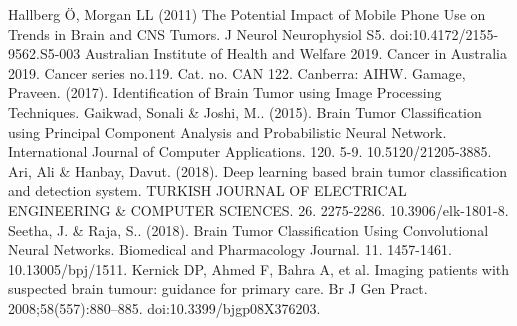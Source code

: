 \documentclass[conference]{IEEEtran}
\begin{document}
\begin{thebibliography}{00}
 Hallberg Ö, Morgan LL (2011) The Potential Impact of Mobile Phone Use on Trends in Brain and CNS Tumors. J Neurol Neurophysiol S5. doi:10.4172/2155-9562.S5-003
 Australian Institute of Health and Welfare 2019. Cancer in Australia 2019. Cancer series no.119. Cat. no. CAN 122. Canberra: AIHW.
 Gamage, Praveen. (2017). Identification of Brain Tumor using Image Processing Techniques. 
 Gaikwad, Sonali \& Joshi, M.. (2015). Brain Tumor Classification using Principal Component Analysis and Probabilistic Neural Network. International Journal of Computer Applications. 120. 5-9. 10.5120/21205-3885.
 Ari, Ali \& Hanbay, Davut. (2018). Deep learning based brain tumor classification and detection system. TURKISH JOURNAL OF ELECTRICAL ENGINEERING \& COMPUTER SCIENCES. 26. 2275-2286. 10.3906/elk-1801-8.
 Seetha, J. \& Raja, S.. (2018). Brain Tumor Classification Using Convolutional Neural Networks. Biomedical and Pharmacology Journal. 11. 1457-1461. 10.13005/bpj/1511. 
 Kernick DP, Ahmed F, Bahra A, et al. Imaging patients with suspected brain tumour: guidance for primary care. Br J Gen Pract. 2008;58(557):880–885. doi:10.3399/bjgp08X376203.
\end{thebibliography}
\end{document}
